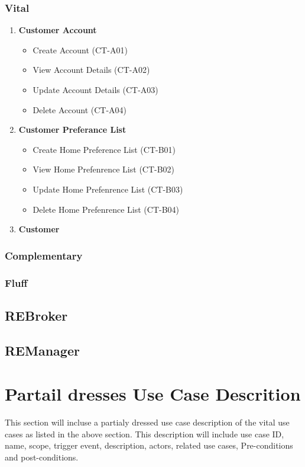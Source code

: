 \documentclass[11pt]{article}
\begin{document}
			\subsubsection{Vital}
				\begin{enumerate}[i]
					\item \textbf{Customer Account}
					\begin{itemize}
						\item Create Account (CT-A01)
						\item View Account Details (CT-A02)
						\item Update Account Details (CT-A03)
						\item Delete Account (CT-A04)
					\end{itemize}
					
					\item \textbf{Customer Preferance List}
					\begin{itemize}
						\item Create Home Preference List (CT-B01)
						\item View Home Prefenrence List (CT-B02)
						\item Update Home Prefenrence List (CT-B03)
						\item Delete Home Prefenrence List (CT-B04)
					\end{itemize}
					
					\item \textbf{Customer}
				\end{enumerate}
	
			\subsubsection{Complementary}
		
			\subsubsection{Fluff}
		

		\subsection{REBroker}
		
		\subsection{REManager}
	
	\section{Partail dresses Use Case Descrition}
	\begin{flushleft}
		This section will incluse a partialy dressed use case description of the vital use cases as listed in the above section. This description will include use case ID, name, scope, trigger event, description, actors, related use cases, Pre-conditions and post-conditions.
	\end{flushleft}
\end{document}
